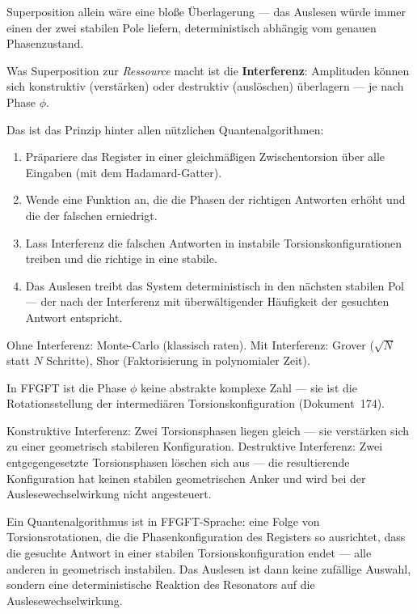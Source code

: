 Superposition allein wäre eine bloße Überlagerung ---
das Auslesen würde immer einen der zwei stabilen Pole
liefern, deterministisch abhängig vom genauen Phasenzustand.

Was Superposition zur \emph{Ressource} macht ist die
\textbf{Interferenz}: Amplituden können sich
konstruktiv (verstärken) oder destruktiv (auslöschen)
überlagern --- je nach Phase $\phi$.

Das ist das Prinzip hinter allen nützlichen
Quantenalgorithmen:
\begin{enumerate}
  \item Präpariere das Register in einer
    gleichmäßigen Zwischentorsion über alle Eingaben
    (mit dem Hadamard-Gatter).
  \item Wende eine Funktion an, die die Phasen
    der richtigen Antworten erhöht und die
    der falschen erniedrigt.
  \item Lass Interferenz die falschen Antworten
    in instabile Torsionskonfigurationen treiben
    und die richtige in eine stabile.
  \item Das Auslesen treibt das System deterministisch
    in den nächsten stabilen Pol ---
    der nach der Interferenz mit überwältigender
    Häufigkeit der gesuchten Antwort entspricht.
\end{enumerate}

Ohne Interferenz: Monte-Carlo (klassisch raten).
Mit Interferenz: Grover ($\sqrt{N}$ statt $N$ Schritte),
Shor (Faktorisierung in polynomialer Zeit).

\begin{foundation}
In FFGFT ist die Phase $\phi$ keine abstrakte
komplexe Zahl --- sie ist die Rotationsstellung
der intermediären Torsionskonfiguration (Dokument~174).

Konstruktive Interferenz: Zwei Torsionsphasen
liegen gleich --- sie verstärken sich zu einer
geometrisch stabileren Konfiguration.
Destruktive Interferenz: Zwei entgegengesetzte
Torsionsphasen löschen sich aus ---
die resultierende Konfiguration hat keinen
stabilen geometrischen Anker und wird bei der
Auslesewechselwirkung nicht angesteuert.

Ein Quantenalgorithmus ist in FFGFT-Sprache:
eine Folge von Torsionsrotationen, die die
Phasenkonfiguration des Registers so ausrichtet,
dass die gesuchte Antwort in einer stabilen
Torsionskonfiguration endet --- alle anderen
in geometrisch instabilen.
Das Auslesen ist dann keine zufällige Auswahl,
sondern eine deterministische Reaktion des
Resonators auf die Auslesewechselwirkung.
\end{foundation}

